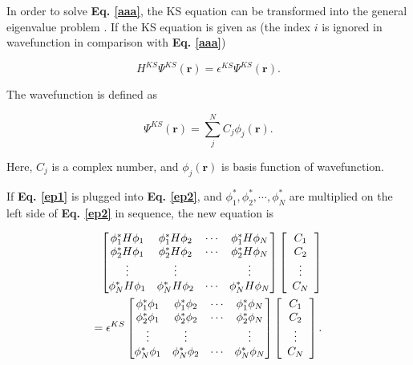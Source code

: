 \documentclass[a4paper, 12pt, titlepage,oneside,drop]{kthesis}
\begin{document}
In order to solve \textbf{Eq. \ref{aaa}}, the KS equation can be transformed into the general eigenvalue problem \cite{martin2004electronic, Cottenierwien2k}.
If the KS equation is given as (the index $i$ is ignored in wavefunction in comparison with \textbf{Eq. \ref{aaa}})

\begin{equation}\label{ep2}
 H^{KS} \Psi^{KS} (\textbf{r}) = \epsilon^{KS} \Psi^{KS} (\textbf{r}).
\end{equation}
 

The wavefunction is defined as

\begin{equation}\label{ep1}
 \Psi^{KS} (\textbf{r}) = \sum\limits_j^N C_j \phi_j (\textbf{r}).
\end{equation}
 
Here, $C_j$ is a complex number, and $\phi_j (\textbf{r})$ is basis function of wavefunction. 


If \textbf{Eq. \ref{ep1}} is plugged into \textbf{Eq. \ref{ep2}}, and $\phi^*_1, \phi^*_2, \cdots, \phi^*_N$ are multiplied on the left side of \textbf{Eq. \ref{ep2}} in sequence, the new equation is

\begin{equation}\begin{split}\label{ep3}
\left[
\begin{matrix}
    \phi^*_1 {H} \phi_1 & \phi^*_1 {H} \phi_2 & \cdots & \phi^*_1 {H} \phi_N \\
    \phi^*_2 {H} \phi_1 & \phi^*_2 {H} \phi_2 & \cdots & \phi^*_2 {H} \phi_N \\
    \vdots               & \vdots               &        & \vdots               \\
    \phi^*_N {H} \phi_1 & \phi^*_N {H} \phi_2 & \cdots & \phi^*_N {H} \phi_N \\
\end{matrix} \right] \left[ \begin{array}{c} C_1 \\ C_2 \\ \vdots \\ C_N\end{array} \right] \\
= \epsilon^{KS} \left[
\begin{matrix}
   \phi^*_1 \phi_1 & \phi^*_1 \phi_2 & \cdots & \phi^*_1 \phi_N \\
   \phi^*_2 \phi_1 & \phi^*_2 \phi_2 & \cdots & \phi^*_2 \phi_N \\
    \vdots               & \vdots               &        & \vdots               \\
   \phi^*_N \phi_1 & \phi^*_N \phi_2 & \cdots & \phi^*_N \phi_N \\
\end{matrix} \right]\left[ \begin{array}{c} C_1 \\ C_2 \\ \vdots \\ C_N\end{array} \right].
\end{split}\end{equation}
\end{document}
